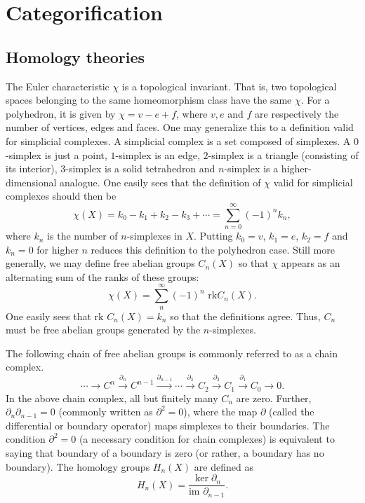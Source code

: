 \chapter{Categorification}
\label{chapter5}

\section{Homology theories}

The Euler characteristic $\chi$ is a topological invariant. That is, two topological spaces belonging to the same homeomorphism class have the same $\chi$. For a polyhedron, it is given by $\chi = v - e + f$, where $v, e$ and $f$ are respectively the number of vertices, edges and faces. One may generalize this to a definition valid for simplicial complexes. A simplicial complex is a set composed of simplexes. A $0$-simplex is just a point, $1$-simplex is an edge, $2$-simplex is a triangle (consisting of its interior), $3$-simplex is a solid tetrahedron and $n$-simplex is a higher-dimensional analogue. One easily sees that the definition of $\chi$ valid for simplicial complexes should then be 
\begin{equation}
\label{eq:1}
\chi(X) = k_0 - k_1 + k_2 - k_3 + \cdots = \sum_{n=0}^{\infty} (-1)^n k_n, 
\end{equation}
where $k_n$ is the number of $n$-simplexes in $X$. Putting $k_0 = v$, $k_1 = e$, $k_2 = f$ and $k_n = 0$ for higher $n$ reduces this definition to the polyhedron case. Still more generally, we may define free abelian groups $C_n(X)$ so that $\chi$ appears as an alternating sum of the ranks of these groups: 
\begin{equation}
\label{eq:2}
\chi(X) = \sum_n^{\infty} (-1)^n \text{ rk}C_n(X).
\end{equation}
One easily sees that $\text{rk } C_n(X) = k_n$ so that the definitions agree. Thus, $C_n$ must be free abelian groups generated by the $n$-simplexes.

The following chain of free abelian groups is commonly referred to as a chain complex.
\begin{equation}
\label{eq:3}
\cdots \to C^n \xrightarrow{\partial_n} C^{n-1} \xrightarrow{\partial_{n-1}} \cdots \xrightarrow{\partial_3} C_2 \xrightarrow{\partial_3} C_1 \xrightarrow{\partial_1} C_0 \to 0.
\end{equation}
In the above chain complex, all but finitely many $C_n$ are zero. Further, $\partial_n \partial_{n-1} = 0$ (commonly written as $\partial^2 = 0$), where the map $\partial$ (called the differential or boundary operator) maps simplexes to their boundaries. The condition $\partial^2 = 0$ (a necessary condition for chain complexes) is equivalent to saying that boundary of a boundary is zero (or rather, a boundary has no boundary). The homology groups $H_n(X)$ are defined as 
\begin{equation}
\label{eq:4}
H_n(X) = \frac{\ker \partial_n}{\text{im }\partial_{n-1}}.
\end{equation}

